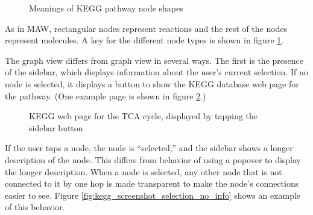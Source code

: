 \begin{figure}[hbt]
    \caption{\label{fig:kegg_node_legend} Meanings of KEGG pathway node shapes}
\end{figure}

As in MAW, rectangular nodes represent reactions and the rest of the nodes
represent molecules. A key for the different node types is shown in figure
\ref{fig:kegg_node_legend}.

The graph view differs from \mawappp graph view in several ways. The first
is the presence of the sidebar, which displays information about the user's
current selection. If no node is selected, it displays a button to show the KEGG
database web page for the pathway. (One example page is shown in figure
\ref{fig:kegg_screenshot_kegg_web_site}.)

\begin{figure}[hbt]
    \caption{\label{fig:kegg_screenshot_kegg_web_site} KEGG web page for the TCA
    cycle, displayed by tapping the sidebar button}
\end{figure}

If the user taps a node, the node is ``selected,'' and the sidebar shows a
longer description of the node.  This differs from \mawappp behavior of using
a popover to display the longer description. When a node is selected, any other
node that is not connected to it by one hop is made transparent to make the
node's connections easier to see.  Figure
\ref{fig:kegg_screenshot_selection_no_info} shows an example of this behavior.

